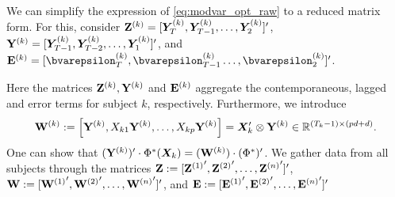 We can simplify the expression of \eqref{eq:modvar_opt_raw} to a reduced matrix form. For this, consider $ \mathbf{Z}^{(k)} = [\bm{Y}^{(k)}_T, \bm{Y}^{(k)}_{T-1},\ldots,\bm{Y}^{(k)}_{2}]'$,  $\mathbf{Y}^{(k)} =  [\bm{Y}^{(k)}_{T-1}, \bm{Y}^{(k)}_{T-2}, \ldots ,\bm{Y}^{(k)}_{1}]'$, and $\Eb^{(k)} = [\bvarepsilon^{(k)}_{T} , \bvarepsilon^{(k)}_{T-1} \ldots , \bvarepsilon^{(k)}_{2}]'$.

Here the matrices $\mathbf{Z}^{(k)}, \mathbf{Y}^{(k)}$ and $\mathbf{E}^{(k)}$ aggregate the contemporaneous, lagged and error terms for subject $k$, respectively. Furthermore, we introduce
\begin{equation*}
    \mathbf{W}^{(k)} := \left[\mathbf{Y}^{(k)} , X_{k1}\mathbf{Y}^{(k)} , \dots , X_{kp}\mathbf{Y}^{(k)} \right] = \bm{X}_k' \otimes \mathbf{Y}^{(k)} \in \mathbb{R}^{(T_k-1) \times (pd + d)}.
\end{equation*}
One can show that $ (\mathbf{Y}^{(k)})' \cdot\Phi^*(\bm{X}_k)  =   (\mathbf{W}^{(k)})\cdot  (\Phi^*)' $. We gather data from all subjects through the matrices $\mathbf{Z} := [{\mathbf{Z}^{(1)}}' , {\mathbf{Z}^{(2)}}' , \ldots , {\mathbf{Z}^{(n)}}']'$, $\mathbf{W} :=  [{\mathbf{W}^{(1)}}', {\mathbf{W}^{(2)}}', \ldots , {\mathbf{W}^{(n)}}']'$, and $\mathbf{E} := [{\mathbf{E}^{(1)}}' , {\mathbf{E}^{(2)}}' , \ldots , {\mathbf{E}^{(n)}}']'$
